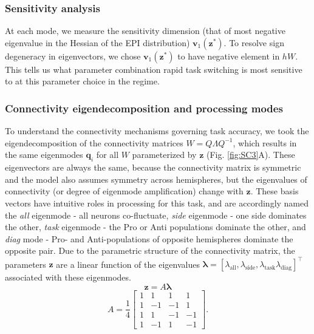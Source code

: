 \documentclass[11pt]{article}
\begin{document}
\subsubsection{Sensitivity analysis} \label{methods_sc_hessian}
At each mode, we measure the sensitivity dimension (that of most negative eigenvalue in the Hessian of the EPI distribution) $\mathbf{v}_1(\mathbf{z}^*)$.
To resolve sign degeneracy in eigenvectors, we chose $\mathbf{v}_1(\mathbf{z}^*)$ to have negative element in $hW$.
This tells us what parameter combination rapid task switching is most sensitive to at this parameter choice in the regime.


\subsubsection{Connectivity eigendecomposition and processing modes} \label{methods_sc_eig}
To understand the connectivity mechanisms governing task accuracy, we took the eigendecomposition of the connectivity matrices $W = Q\Lambda Q^{-1}$, which results in the same eigenmodes $\mathbf{q}_i$ for all $W$ parameterized by $\mathbf{z}$ (Fig. \ref{fig:SC3}A). 
These eigenvectors are always the same, because the connectivity matrix is symmetric and the model also assumes symmetry across hemispheres, but the eigenvalues of connectivity (or degree of eigenmode amplification) change with $\mathbf{z}$.
These basis vectors have intuitive roles in processing for this task, and are accordingly named the \textit{all} eigenmode - all neurons co-fluctuate, \textit{side} eigenmode - one side dominates the other, \textit{task} eigenmode - the Pro or Anti populations dominate the other, and \textit{diag} mode - Pro- and Anti-populations of opposite hemispheres dominate the opposite pair. 
Due to the parametric structure of the connectivity matrix, the parameters $\mathbf{z}$ are a linear function of the eigenvalues $\bm{\lambda} = [\lambda_{\text{all}}, \lambda_{\text{side}}, \lambda_{\text{task}}\lambda_{\text{diag}}]^\top$ associated with these eigenmodes.
\begin{equation}
\mathbf{z} = A\bm{\lambda}
\end{equation}
\begin{equation}
A = \frac{1}{4} \begin{bmatrix} 1 & 1 & 1 & 1 \\ 1 & -1 & -1 & 1 \\ 1 & 1 & -1 & -1 \\ 1 & -1 & 1 & -1 \end{bmatrix}.
\end{equation}
\end{document}
